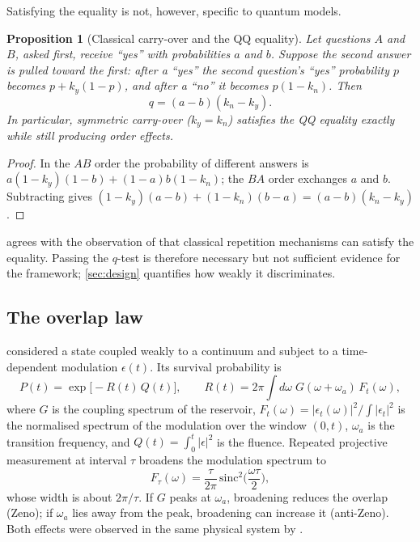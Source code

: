\documentclass[11pt]{article}
\newtheorem{proposition}{Proposition}
\theoremstyle{definition}
\theoremstyle{remark}
\begin{document}
Satisfying the equality is not, however, specific to quantum models.

\begin{proposition}[Classical carry-over and the QQ equality]
\label{prop:carry}
Let questions $A$ and $B$, asked first, receive ``yes'' with probabilities $a$ and $b$. Suppose the second answer is pulled toward the first: after a ``yes'' the second question's ``yes'' probability $p$ becomes $p+k_y(1-p)$, and after a ``no'' it becomes $p(1-k_n)$. Then
\[ q=(a-b)(k_n-k_y). \]
In particular, symmetric carry-over ($k_y=k_n$) satisfies the QQ equality exactly while still producing order effects.
\end{proposition}
\begin{proof}
In the $AB$ order the probability of different answers is $a(1-k_y)(1-b)+(1-a)b(1-k_n)$; the $BA$ order exchanges $a$ and $b$. Subtracting gives $(1-k_y)(a-b)+(1-k_n)(b-a)=(a-b)(k_n-k_y)$.
\end{proof}

 agrees with the observation of \citet{kang2026} that classical repetition mechanisms can satisfy the equality. Passing the $q$-test is therefore necessary but not sufficient evidence for the framework; \cref{sec:design} quantifies how weakly it discriminates.

\subsection{The overlap law}
\citet{kofman2001,kofman2005} considered a state coupled weakly to a continuum and subject to a time-dependent modulation $\epsilon(t)$. Its survival probability is
\begin{equation}
P(t)=\exp\!\big[-R(t)\,Q(t)\big],\qquad R(t)=2\pi\!\int\! d\omega\; G(\omega+\omega_a)\,F_t(\omega),
\label{eq:overlap}
\end{equation}
where $G$ is the coupling spectrum of the reservoir, $F_t(\omega)=|\epsilon_t(\omega)|^2/\!\int|\epsilon_t|^2$ is the normalised spectrum of the modulation over the window $(0,t)$, $\omega_a$ is the transition frequency, and $Q(t)=\int_0^t|\epsilon|^2$ is the fluence. Repeated projective measurement at interval $\tau$ broadens the modulation spectrum to
\begin{equation}
F_\tau(\omega)=\frac{\tau}{2\pi}\,\mathrm{sinc}^2\!\Big(\frac{\omega\tau}{2}\Big),
\label{eq:sinc}
\end{equation}
whose width is about $2\pi/\tau$. If $G$ peaks at $\omega_a$, broadening reduces the overlap (Zeno); if $\omega_a$ lies away from the peak, broadening can increase it (anti-Zeno). Both effects were observed in the same physical system by \citet{fischer2001}.
\end{document}
